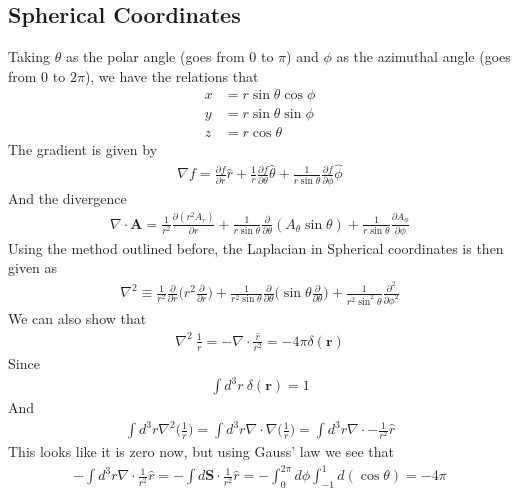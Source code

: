 \subsection{Spherical Coordinates}\label{sphere}
Taking $\theta$ as the polar angle (goes from 0 to $\pi$) and $\phi$ as the azimuthal angle (goes from $0$ to $2\pi$), we have the relations that
\begin{align}
x &= r\sin\theta\cos\phi\\
y &= r\sin\theta\sin\phi\\
z &= r\cos\theta
\end{align}
The gradient is given by
\begin{align}
\nabla f = \frac{\partial f}{\partial r}\hat{r} +\frac{1}{r}\frac{\partial f}{\partial \theta}\hat{\theta} + \frac{1}{r\sin\theta}\frac{\partial f}{\partial\phi}\hat{\phi}
\end{align}
And the divergence
\begin{align}
\nabla\cdot\textbf{A} = \frac{1}{r^2}\frac{\partial(r^2A_r)}{\partial r} + \frac{1}{r\sin\theta}\frac{\partial}{\partial\theta}(A_\theta\sin\theta) + \frac{1}{r\sin\theta}\frac{\partial A_\phi}{\partial\phi}
\end{align}
Using the method outlined before, the Laplacian in Spherical coordinates is then given as
\begin{align}
\nabla^2\equiv \frac{1}{r^2} \frac{\partial}{\partial r}\Big(r^2\frac{\partial}{\partial r}\Big) + \frac{1}{r^2\sin\theta}\frac{\partial}{\partial\theta}\Big(\sin\theta\frac{\partial}{\partial\theta}\Big) +\frac{1}{r^2\sin^2\theta}\frac{\partial^2}{\partial\phi^2} 
\end{align}
We can also show that 
\begin{align}\label{dirac}
\boxed{\nabla^2 ~\frac{1}{r}= -\nabla\cdot\frac{\hat{r}}{r^2} = -4\pi\delta(\textbf{r})}
\end{align}
Since
\begin{align}
\int d^3r ~\delta(\textbf{r}) = 1
\end{align}
And
\begin{align}
\int d^3r \nabla^2\Big(\frac{1}{r}\Big) = \int d^3r \nabla\cdot\nabla\Big(\frac{1}{r}\Big) = \int d^3 r \nabla\cdot -\frac{1}{r^2}\hat{r}
\end{align}
This looks like it is zero now, but using Gauss' law we see that
\begin{align}
- \int d^3 r \nabla\cdot \frac{1}{r^2}\hat{r} = -\int d\textbf{S}\cdot \frac{1}{r^2}\hat{r} = -\int_0^{2\pi}d\phi\int_{-1}^1 d(\cos\theta) = -4\pi
\end{align}
